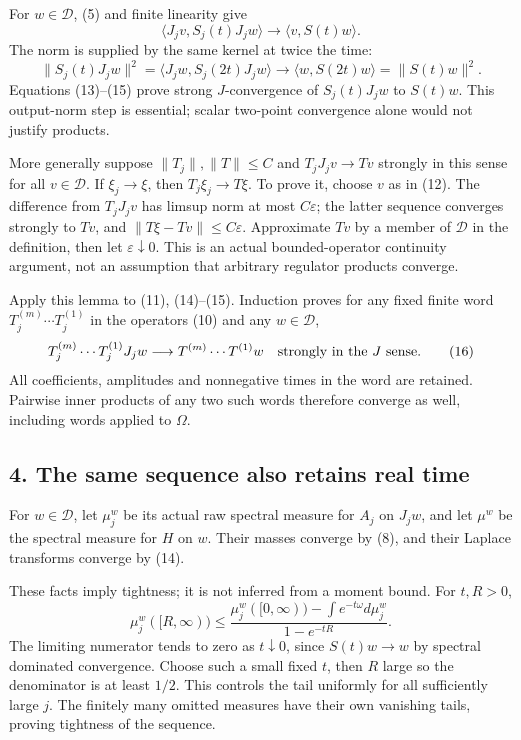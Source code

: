 \documentclass[
  11pt,
]{article}
\begin{document}
For \(w\in\mathcal D\), (5) and finite linearity give \[
 \langle J_jv,S_j(t)J_jw\rangle\to\langle v,S(t)w\rangle .
 \tag{14}
\] The norm is supplied by the same kernel at twice the time: \[
 \|S_j(t)J_jw\|^2
 =\langle J_jw,S_j(2t)J_jw\rangle
 \longrightarrow
 \langle w,S(2t)w\rangle=\|S(t)w\|^2 .
 \tag{15}
\] Equations (13)--(15) prove strong \(J\)-convergence of \(S_j(t)J_jw\)
to \(S(t)w\). This output-norm step is essential; scalar two-point
convergence alone would not justify products.

More generally suppose \(\|T_j\|,\|T\|\le C\) and \(T_jJ_jv\to Tv\)
strongly in this sense for all \(v\in\mathcal D\). If \(\xi_j\to\xi\),
then \(T_j\xi_j\to T\xi\). To prove it, choose \(v\) as in (12). The
difference from \(T_jJ_jv\) has limsup norm at most \(C\varepsilon\);
the latter sequence converges strongly to \(Tv\), and
\(\|T\xi-Tv\|\le C\varepsilon\). Approximate \(Tv\) by a member of
\(\mathcal D\) in the definition, then let \(\varepsilon\downarrow0\).
This is an actual bounded-operator continuity argument, not an
assumption that arbitrary regulator products converge.

Apply this lemma to (11), (14)--(15). Induction proves for any fixed
finite word \(T_j^{(m)}\cdots T_j^{(1)}\) in the operators (10) and any
\(w\in\mathcal D\), \[
 T_j^{(m)}\cdots T_j^{(1)}J_jw
 \longrightarrow
 T^{(m)}\cdots T^{(1)}w
 \quad\hbox{strongly in the }J\hbox{ sense}.
 \tag{16}
\] All coefficients, amplitudes and nonnegative times in the word are
retained. Pairwise inner products of any two such words therefore
converge as well, including words applied to \(\Omega\).

\subsection{4. The same sequence also retains real
time}\label{weak-coupling-part-7-the-same-sequence-also-retains-real-time}

For \(w\in\mathcal D\), let \(\mu_j^w\) be its actual raw spectral
measure for \(A_j\) on \(J_jw\), and let \(\mu^w\) be the spectral
measure for \(H\) on \(w\). Their masses converge by (8), and their
Laplace transforms converge by (14).

These facts imply tightness; it is not inferred from a moment bound. For
\(t,R>0\), \[
 \mu_j^w([R,\infty))
 \le
 \frac{\mu_j^w([0,\infty))-\int e^{-t\omega}d\mu_j^w}
      {1-e^{-tR}} .
 \tag{17}
\] The limiting numerator tends to zero as \(t\downarrow0\), since
\(S(t)w\to w\) by spectral dominated convergence. Choose such a small
fixed \(t\), then \(R\) large so the denominator is at least \(1/2\).
This controls the tail uniformly for all sufficiently large \(j\). The
finitely many omitted measures have their own vanishing tails, proving
tightness of the sequence.
\end{document}
